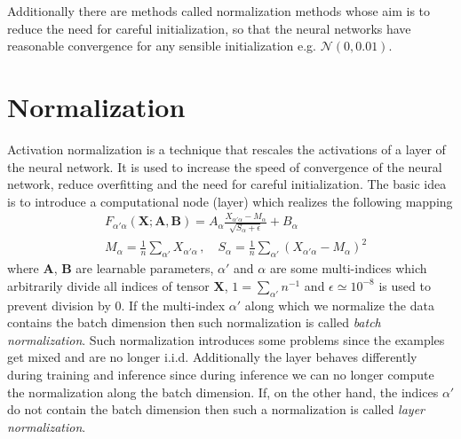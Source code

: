 \documentclass[a5paper]{article}
\newcommand{\mc}[1]{\mathcal{#1}}
\begin{document}
Additionally there are methods called normalization methods whose aim is to reduce the need for
careful initialization, so that the neural networks have reasonable convergence for any sensible
initialization e.g. \(\mc{N}(0,0.01)\).


\section{Normalization}

Activation normalization is a technique that rescales the activations of a layer of the neural
network. It is used to increase the speed of convergence of the neural network, reduce overfitting
and the need for careful initialization. The basic idea is to introduce a computational node (layer)
which realizes the following mapping
\[
\begin{split}
   &F_{\alpha'\alpha}(\bm{X}; \bm{A},\bm{B}) = A_\alpha \frac{X_{\alpha'\alpha} - M_\alpha}{\sqrt{S_\alpha + \epsilon}} + B_\alpha\\
   &M_\alpha = \frac{1}{n} \sum_{\alpha'} X_{\alpha'\alpha}\,,\quad S_\alpha = \frac{1}{n} \sum_{\alpha'} (X_{\alpha'\alpha} - M_\alpha)^2
\end{split}
\]
where \(\bm{A}\), \(\bm{B}\) are learnable parameters, \(\alpha'\) and \(\alpha\) are some
multi-indices which arbitrarily divide all indices of tensor \(\bm{X}\), \(1 = \sum_{\alpha'}
n^{-1}\) and \(\epsilon \simeq 10^{-8}\) is used to prevent division by 0. If the multi-index
\(\alpha'\) along which we normalize the data contains the batch dimension then such normalization
is called \emph{batch normalization}. Such normalization introduces some problems since the examples
get mixed and are no longer i.i.d. Additionally the layer behaves differently during training and
inference since during inference we can no longer compute the normalization along the batch
dimension. If, on the other hand, the indices \(\alpha'\) do not contain the batch dimension then
such a normalization is called \emph{layer normalization}.
\end{document}
